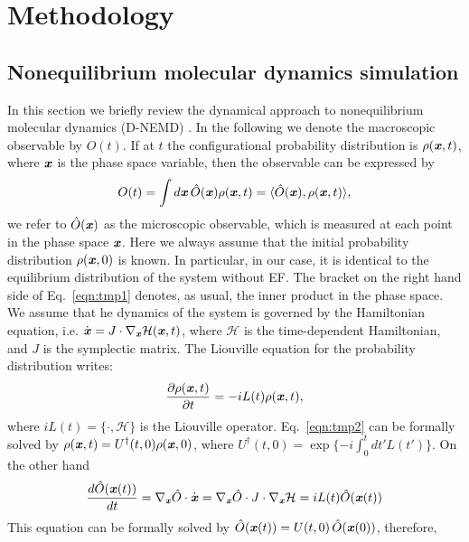 \documentclass[a4paper,preprint,unsortedaddress,onecolumn]{revtex4-1}
\newcommand{\vect}[1]{\textbf{\textit{#1}}}
\begin{document}
\section{Methodology}
\subsection{Nonequilibrium molecular dynamics simulation}
In this section we briefly review the dynamical approach to nonequilibrium
molecular dynamics (D-NEMD) \cite{ciccotti1975direct, ciccotti1979thought,
  orlandini2011hydrodynamics, orlandini2011hydrodynamics-01}.
In the following we denote the macroscopic observable by $O(t)$. If at $t$
the configurational probability distribution is $\rho(\vect x, t)$, where
$\vect x$ is the phase space variable, then the observable can be
expressed by
\begin{align}\label{eqn:tmp1}
  O(t) = \int d\vect x\, \hat O(\vect x)\rho(\vect x, t)  = \langle \hat O(\vect x), \rho(\vect x, t)\rangle,
\end{align}
we refer to $\hat O (\vect x)$ as the microscopic observable, 
which is measured at each point in the phase space $\vect x$.
Here we always assume that the initial probability distribution
$\rho(\vect x, 0)$ is known. In particular, in our case,
it is identical to the equilibrium distribution of the system
without EF.
The bracket on the right hand side of Eq.~\eqref{eqn:tmp1} denotes, as usual, the inner product in the
phase space.  We assume that he dynamics of the system is governed by the
Hamiltonian equation, i.e. $\dot {\vect x} = J \cdot \nabla_{\vect x}
\mathcal H(\vect x, t)$, where $\mathcal H$ is the time-dependent Hamiltonian,
and $J$ is
the symplectic matrix. The Liouville equation for the probability
distribution writes:
\begin{align}\label{eqn:tmp2}
  \frac{\partial \rho(\vect x, t)}{\partial t} = - iL(t) \rho(\vect x, t),
\end{align}
where $iL(t) = \{\cdot, \mathcal H\}$ is the Liouville operator.
Eq.~\eqref{eqn:tmp2}
can be formally solved by $\rho(\vect x, t) = U^\dagger(t,0) \rho(\vect x, 0)$,
where $U^\dagger(t,0) = \exp\{-i \int_0^t d t' L(t')\}$.
On the other hand
\begin{align}
  \frac{d \hat O(\vect x(t))}{dt} = \nabla_{\vect x}\hat O\cdot \dot{\vect x}
  = \nabla_{\vect x}\hat O\cdot J\cdot \nabla_{\vect x}\mathcal H
  = iL(t) \hat O (\vect x(t))
\end{align}
This equation can be formally solved by
$\hat O(\vect x(t)) = U(t,0)\,\hat O(\vect x(0))$, therefore,
\end{document}
